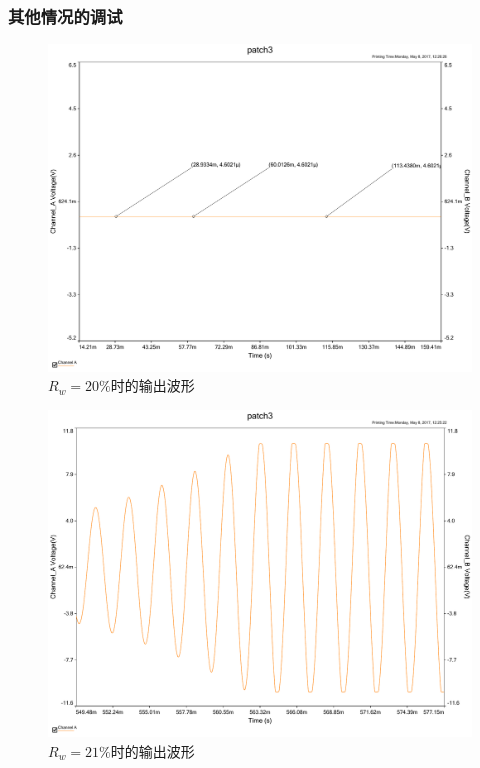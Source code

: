 \documentclass[UTF8,a4paper]{paper}
\begin{document}
\subsubsection{其他情况的调试}
\begin{multicols}{2}
\begin{figure}[H]
\centering
\includegraphics[width=\columnwidth]{0ac.pdf}
\caption{$R_w=20\%$时的输出波形}
\label{20}
\end{figure}
\begin{figure}[H]
\centering
\includegraphics[width=\columnwidth]{21ac.pdf}
\caption{$R_w=21\%$时的输出波形}
\label{21}
\end{figure}
\begin{figure}[H]

\end{figure}
\end{multicols}
\end{document}
